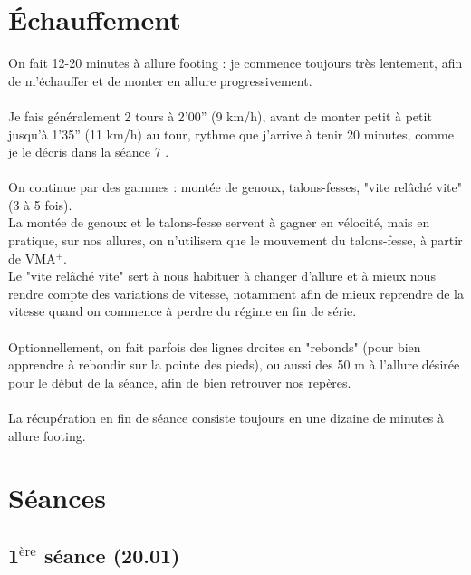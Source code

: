 \documentclass{article}
\begin{document}
\section{Échauffement}
    On fait 12-20 minutes à allure footing : je commence toujours très lentement, afin de m'échauffer et de monter en allure progressivement.\\\\
    Je fais généralement 2 tours à 2'00'' (9 km/h), avant de monter petit à petit jusqu'à 1'35'' (11 km/h) au tour, rythme que j'arrive à tenir 20 minutes, comme je le décris dans la \underline{\hyperref[sec:seance7]{séance 7 {\scriptsize {}}}}.\\\\
    On continue par des gammes : montée de genoux, talons-fesses, "vite relâché vite" (3 à 5 fois).\\
    La montée de genoux et le talons-fesse servent à gagner en vélocité, mais en pratique, sur nos allures, on n'utilisera que le mouvement du talons-fesse, à partir de VMA$^+$.\\
    Le "vite relâché vite" sert à nous habituer à changer d'allure et à mieux nous rendre compte des variations de vitesse, notamment afin de mieux reprendre de la vitesse quand on commence à perdre du régime en fin de série.\\\\
    Optionnellement, on fait parfois des lignes droites en "rebonds" (pour bien apprendre à rebondir sur la pointe des pieds), ou aussi des 50 m à l'allure désirée pour le début de la séance, afin de bien retrouver nos repères.\\\\
    La récupération en fin de séance consiste toujours en une dizaine de minutes à allure footing.%
%

\section{Séances}
    \subsection{1$^{\text{ère}}$ séance (20.01)}
\end{document}
